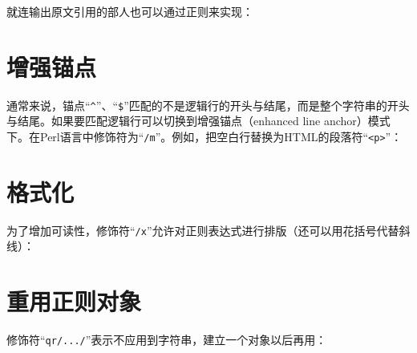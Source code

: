 就连输出原文引用的部人也可以通过正则来实现：



\section{增强锚点}

通常来说，锚点“\verb|^|”、“\verb|$|”匹配的不是逻辑行的开头与结尾，而是整个字符串的开头与结尾。如果要匹配逻辑行可以切换到增强锚点（enhanced line anchor）模式下。在Perl语言中修饰符为“\verb|/m|”。例如，把空白行替换为HTML的段落符“\verb|<p>|”：




\section{格式化}

为了增加可读性，修饰符“\verb|/x|”允许对正则表达式进行排版（还可以用花括号代替斜线）：




\section{重用正则对象}

修饰符“\verb|qr/.../|”表示不应用到字符串，建立一个对象以后再用：



